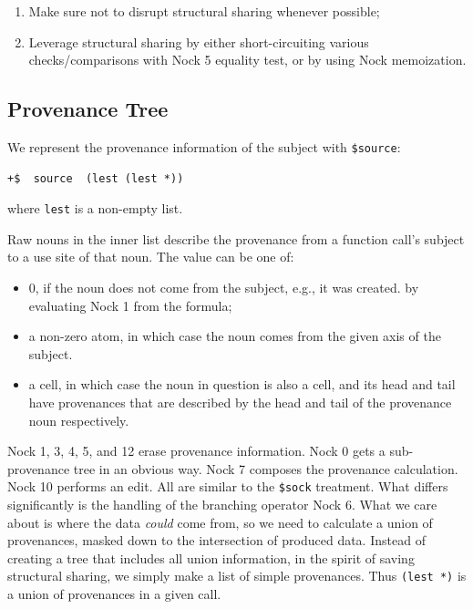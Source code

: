 \documentclass[twoside]{article}
\begin{document}
\begin{enumerate}
\item Make sure not to disrupt structural sharing whenever possible;
\item Leverage structural sharing by either short-circuiting various
 checks/comparisons with Nock 5 equality test, or by using Nock memoization.
\end{enumerate}

\subsection{Provenance Tree}

We represent the provenance information of the subject with \lstinline[style=inlinecode]{$source}:

\begin{lstlisting}[style=listingblock]
+$  source  (lest (lest *))
\end{lstlisting}

\noindent
where \lstinline[style=inlinecode]{lest} is a non-empty list.  

Raw nouns in the inner list describe the provenance from a function call's subject to a use site of that noun.  The value can be one of:

\begin{itemize}
\item 0, if the noun does not come from the subject, e.g., it was created. by evaluating Nock 1 from the formula;
\item a non-zero atom, in which case the noun comes from the given axis of the subject.
\item a cell, in which case the noun in question is also a cell, and its head and tail have provenances that are described by the head and tail of the provenance noun respectively.
\end{itemize}

Nock 1, 3, 4, 5, and 12 erase provenance information. Nock 0 gets a sub-provenance tree in an obvious way. Nock 7 composes the provenance calculation. Nock 10 performs an edit.  All are similar to the \lstinline[style=inlinecode]{$sock} treatment.  What differs significantly is the handling of the branching operator Nock 6.  What we care about is where the data \emph{could} come from, so we need to calculate a union of provenances, masked down to the intersection of produced data.  Instead of creating a tree that includes all union information, in the spirit of saving structural sharing, we simply make a list of simple provenances.  Thus \lstinline[style=inlinecode]{(lest *)} is a union of provenances in a given call.
\end{document}
